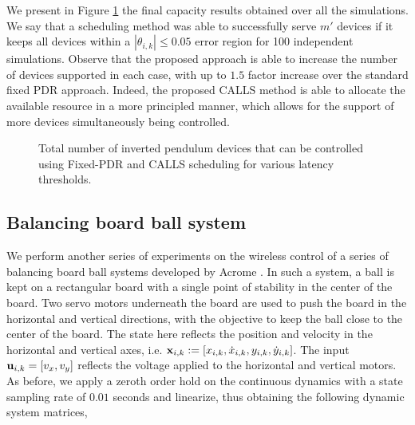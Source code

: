 We present in Figure \ref{fig_ip_bar} the final capacity results obtained over all the simulations. We say that a scheduling method was able to successfully serve $m'$ devices if it keeps all devices within a  $|\theta_{i,k}| \leq 0.05$ error region for 100 independent simulations. Observe that the proposed approach is able to increase the number of devices supported in each case, with up to $1.5$ factor increase over the standard fixed PDR approach. Indeed, the proposed CALLS method is able to allocate the available resource in a more principled manner, which allows for the support of more devices simultaneously being controlled. 

\begin{figure}
\centering
{}
\caption{Total number of inverted pendulum devices that can be controlled using Fixed-PDR and CALLS scheduling for various latency thresholds.}
\label{fig_ip_bar}
\end{figure}



\subsection{Balancing board ball system}


We perform another series of experiments on the wireless control of a series of balancing board ball systems developed by Acrome \cite{acrome}. In such a system, a ball is kept on a rectangular board with a single point of stability in the center of the board. Two servo motors underneath the board are used to push the board in the horizontal and vertical directions, with the objective to keep the ball close to the center of the board. The state here reflects the position and velocity in the horizontal and vertical axes, i.e. ${\mathbf x}_{i,k} := [x_{i,k}, \dot{x}_{i,k}, y_{i,k}, \dot{y}_{i,k}]$.  The input ${\mathbf u}_{i,k} = [v_x, v_y]$ reflects the voltage applied to the horizontal and vertical motors. As before, we apply a zeroth order hold on the continuous dynamics with a state sampling rate of $0.01$ seconds and linearize, thus obtaining the following dynamic system matrices,
%

